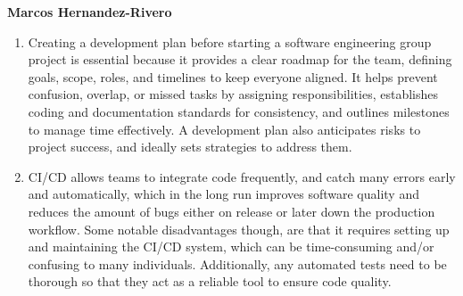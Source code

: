 \textbf{Marcos Hernandez-Rivero}
\begin{enumerate}
\item{Creating a development plan before starting a software engineering group project is essential because it provides a clear roadmap for the team, defining goals, scope, roles, and timelines to keep everyone aligned. It helps prevent confusion, overlap, or missed tasks by assigning responsibilities, establishes coding and documentation standards for consistency, and outlines milestones to manage time effectively. A development plan also anticipates risks to project success, and ideally sets strategies to address them.}
\item{CI/CD allows teams to integrate code frequently, and catch many errors early and automatically, which in the long run improves software quality and reduces the amount of bugs either on release or later down the production workflow. Some notable disadvantages though, are that it requires setting up and maintaining the CI/CD system, which can be time-consuming and/or confusing to many individuals. Additionally, any automated tests need to be thorough so that they act as a reliable tool to ensure code quality.}
\end{enumerate}